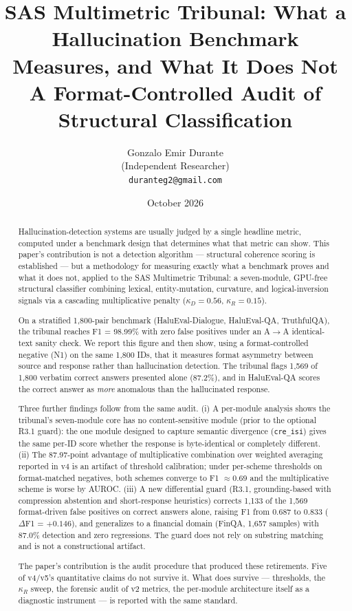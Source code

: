 \documentclass[11pt,a4paper]{article}
\title{SAS Multimetric Tribunal: What a Hallucination Benchmark Measures, and What It Does Not \\ \large A Format-Controlled Audit of Structural Classification}
\author{Gonzalo Emir Durante\\(Independent Researcher)\\ \texttt{duranteg2@gmail.com}}
\date{October 2026}
\begin{document}
\maketitle

\begin{abstract}
Hallucination-detection systems are usually judged by a single headline metric, computed under a benchmark design that determines what that metric can show. This paper's contribution is not a detection algorithm --- structural coherence scoring is established --- but a methodology for measuring exactly what a benchmark proves and what it does not, applied to the SAS Multimetric Tribunal: a seven-module, GPU-free structural classifier combining lexical, entity-mutation, curvature, and logical-inversion signals via a cascading multiplicative penalty ($\kappa_D = 0.56$, $\kappa_R = 0.15$).

On a stratified 1{,}800-pair benchmark (HaluEval-Dialogue, HaluEval-QA, TruthfulQA), the tribunal reaches F1 = 98.99\% with zero false positives under an A$\rightarrow$A identical-text sanity check. We report this figure and then show, using a format-controlled negative (N1) on the same 1{,}800 IDs, that it measures format asymmetry between source and response rather than hallucination detection. The tribunal flags 1{,}569 of 1{,}800 verbatim correct answers presented alone (87.2\%), and in HaluEval-QA scores the correct answer as \emph{more} anomalous than the hallucinated response.

Three further findings follow from the same audit. (i) A per-module analysis shows the tribunal's seven-module core has no content-sensitive module (prior to the optional R3.1 guard): the one module designed to capture semantic divergence (\texttt{cre\_isi}) gives the same per-ID score whether the response is byte-identical or completely different. (ii) The 87.97-point advantage of multiplicative combination over weighted averaging reported in v4 is an artifact of threshold calibration; under per-scheme thresholds on format-matched negatives, both schemes converge to F1 $\approx 0.69$ and the multiplicative scheme is worse by AUROC. (iii) A new differential guard (R3.1, grounding-based with compression abstention and short-response heuristics) corrects 1{,}133 of the 1{,}569 format-driven false positives on correct answers alone, raising F1 from 0.687 to 0.833 ($\Delta$F1 = $+0.146$), and generalizes to a financial domain (FinQA, 1{,}657 samples) with 87.0\% detection and zero regressions. The guard does not rely on substring matching and is not a constructional artifact.

The paper's contribution is the audit procedure that produced these retirements. Five of v4/v5's quantitative claims do not survive it. What does survive --- thresholds, the $\kappa_R$ sweep, the forensic audit of v2 metrics, the per-module architecture itself as a diagnostic instrument --- is reported with the same standard.
\end{abstract}
\end{document}
